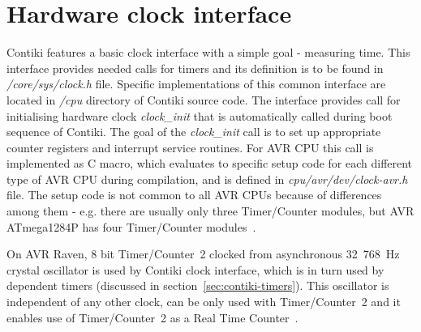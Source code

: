 
\section{Hardware clock interface}
Contiki features a basic clock interface with a simple goal - measuring time.
This interface provides needed calls for timers and its definition is to be found in {\it{/core/sys/clock.h}} file.
Specific implementations of this common interface are located in {\it{/cpu}} directory of Contiki source code.
The interface provides call for initialising hardware clock {\it{clock\_init}} that is automatically called during
boot sequence of Contiki.
The goal of the {\it{clock\_init}} call is to set up
appropriate counter registers and interrupt service routines. %
For AVR CPU this call is implemented as C macro, which evaluates to specific setup code for each
different type of AVR CPU during compilation, and is defined in {\it{cpu/avr/dev/clock-avr.h}} file.
The setup code is not common to all AVR CPUs because of differences among them - e.g. there are usually
only three Timer/Counter modules, but AVR ATmega1284P has four Timer/Counter modules~\cite{avr-datasheet}.

On AVR Raven, 8 bit Timer/Counter~2 clocked from asynchronous 32~768~Hz crystal oscillator
is used by Contiki clock interface,
which is in turn used by dependent timers (discussed in section~\ref{sec:contiki-timers}).
This oscillator is independent of any other clock,
can be only used with Timer/Counter~2 and it
enables use of Timer/Counter~2 as a Real Time Counter~\cite{avr-datasheet}.


